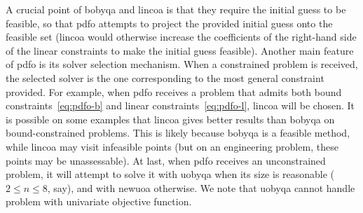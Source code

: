 \documentclass[11pt,draft]{article}
\numberwithin{equation}{section}
\begin{document}
A crucial point of \gls{bobyqa} and \gls{lincoa} is that they require the initial guess to be feasible, so that \gls{pdfo} attempts to project the provided initial guess onto the feasible set (\gls{lincoa} would otherwise increase the coefficients of the right-hand side of the linear constraints to make the initial guess feasible).
Another main feature of \gls{pdfo} is its solver selection mechanism.
When a constrained problem is received, the selected solver is the one corresponding to the most general constraint provided.
For example, when \gls{pdfo} receives a problem that admits both bound constraints~\cref{eq:pdfo-b} and linear constraints~\cref{eq:pdfo-l}, \gls{lincoa} will be chosen.
It is possible on some examples that \gls{lincoa} gives better results than \gls{bobyqa} on bound-constrained problems.
This is likely because \gls{bobyqa} is a feasible method, while \gls{lincoa} may visit infeasible points (but on an engineering problem, these points may be unassessable).
At last, when \gls{pdfo} receives an unconstrained problem, it will attempt to solve it with \gls{uobyqa} when its size is reasonable ($2 \le n \le 8$, say), and with \gls{newuoa} otherwise.
We note that \gls{uobyqa} cannot handle problem with univariate objective function.
\end{document}
